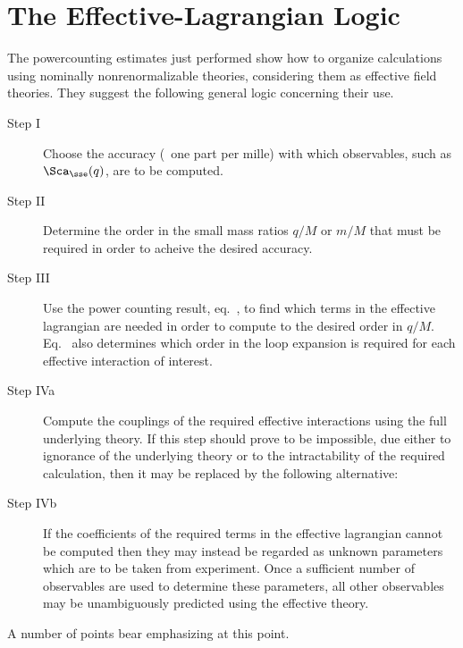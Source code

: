 \documentclass[12pt]{report}
\begin{document}
\section{The Effective-Lagrangian Logic}

The powercounting estimates just performed show how to
organize calculations using nominally nonrenormalizable
theories, considering them as effective field theories. 
They suggest the following general logic concerning 
their use.

\begin{description}

\item[Step I]
Choose the accuracy (\eg\ one part per mille) with which
observables, such as $\Sca_\sse(q)$, are to be computed.

\item[Step II]
Determine the order in the small mass ratios $q/M$ or $m/M$
that must be required in order to acheive the desired
accuracy.

\item[Step III]
Use the power counting result, eq.~, to
find which terms in the effective lagrangian are needed in
order to compute to the desired order in $q/M$.
Eq.~ also determines which order in the
loop expansion is required for each effective interaction
of interest.

\item[Step IVa]
Compute the couplings of the required effective
interactions using the full underlying theory. If this step
should prove to be impossible, due either to ignorance of
the underlying theory or to the intractability of the
required calculation, then it may be replaced by the
following alternative:

\item[Step IVb]
If the coefficients of the required terms in the effective
lagrangian cannot be computed then they may instead be
regarded as unknown parameters which are to be taken from
experiment. Once a sufficient number of observables are
used to determine these parameters, all other observables
may be unambiguously predicted using the effective theory.

\end{description}

A number of points bear emphasizing at this point.
\end{document}
